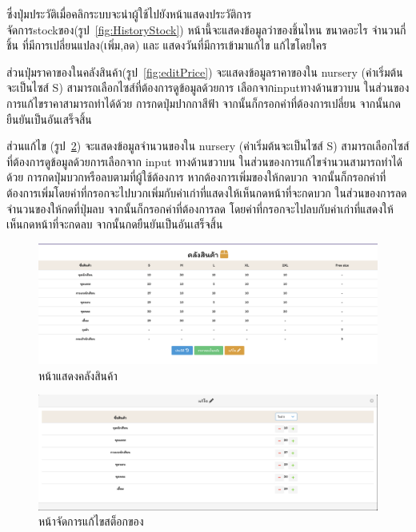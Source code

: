 \begin{itemize}
  ซึ่งปุ่มประวัติเมื่อคลิกระบบจะนำผู้ใช้ไปยังหน้าแสดงประวัติการจัดการstockของ(รูป~\ref{fig:HistoryStock}) หน้านี้จะแสดงข้อมูลว่าของชิ้นไหน ขนาดอะไร จำนวนกี่ชิ้น ที่มีการเปลี่ยนแปลง(เพิ่ม,ลด) และ แสดงวันที่มีการเข้ามาแก้ไข แก้ไขโดยใคร
  
  ส่วนปุ่มราคาของในคลังสินค้า(รูป~\ref{fig:editPrice}) จะแสดงข้อมูลราคาของใน nursery (ค่าเริ่มต้นจะเป็นไซส์ S) สามารถเลือกไซส์ที่ต้องการดูข้อมูลด้วยการ เลือกจากinputทางด้านขวาบน ในส่วนของการแก้ไขราคาสามารถทำได้ด้วย การกดปุ่มปากกาสีฟ้า จากนั้นก็กรอกค่าที่ต้องการเปลี่ยน
  จากนั้นกดยืนยันเป็นอันเสร็จสิ้น
  
  ส่วนแก้ไข (รูป~\ref{fig:CheckStock}) จะแสดงข้อมูลจำนวนของใน nursery (ค่าเริ่มต้นจะเป็นไซส์ S) สามารถเลือกไซส์ที่ต้องการดูข้อมูลด้วยการเลือกจาก input ทางด้านขวาบน 
  ในส่วนของการแก้ไขจำนวนสามารถทำได้ด้วย การกดปุ่มบวกหรือลบตามที่ผู้ใช้ต้องการ หากต้องการเพิ่มของให้กดบวก จากนั้นก็กรอกค่าที่ต้องการเพิ่มโดยค่าที่กรอกจะไปบวกเพิ่มกับค่าเก่าที่แสดงให้เห็นกดหน้าที่จะกดบวก ในส่วนของการลดจำนวนของให้กดที่ปุ่มลบ จากนั้นก็กรอกค่าที่ต้องการลด โดยค่าที่กรอกจะไปลบกับค่าเก่าที่แสดงให้เห็นกดหน้าที่จะกดลบ จากนั้นกดยืนยันเป็นอันเสร็จสิ้น

  
    \begin{figure}
      \begin{center}
      \includegraphics[width=\linewidth]{images/Stock.png}
      \end{center}
      \caption[หน้าแสดงคลังสินค้า]{หน้าแสดงคลังสินค้า}
      \label{fig:Stock}
      \end{figure}
  
  
    \begin{figure}
      \begin{center}
      \includegraphics[width=\linewidth]{images/handleStock.png}
      \end{center}
      \caption[หน้าจัดการแก้ไขสต็อกของ]{หน้าจัดการแก้ไขสต็อกของ}
      \label{fig:CheckStock}
      \end{figure}
  

\end{itemize}
